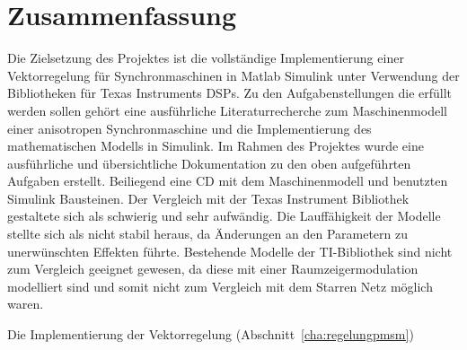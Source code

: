 
\chapter{Zusammenfassung}
\label{cha:zusammenfassung}

Die Zielsetzung des Projektes ist die vollständige Implementierung einer Vektorregelung für Synchronmaschinen in Matlab Simulink unter Verwendung der Bibliotheken für Texas Instruments DSPs.
Zu den Aufgabenstellungen die erfüllt werden sollen gehört eine ausführliche Literaturrecherche zum Maschinenmodell einer anisotropen Synchronmaschine und die Implementierung des mathematischen Modells in Simulink.
Im Rahmen des Projektes wurde eine ausführliche und übersichtliche Dokumentation zu den oben aufgeführten Aufgaben erstellt.
Beiliegend eine CD mit dem Maschinenmodell und benutzten Simulink Bausteinen.
Der Vergleich mit der Texas Instrument Bibliothek gestaltete sich als schwierig und sehr aufwändig.
Die Lauffähigkeit der Modelle stellte sich als nicht stabil heraus, da Änderungen an den Parametern zu unerwünschten Effekten führte.
Bestehende Modelle der TI-Bibliothek sind nicht zum Vergleich geeignet gewesen, da diese mit einer Raumzeigermodulation modelliert sind und somit nicht zum Vergleich mit dem Starren Netz möglich waren.

Die Implementierung der Vektorregelung (\sh Abschnitt~\ref{cha:regelungpmsm}) 



